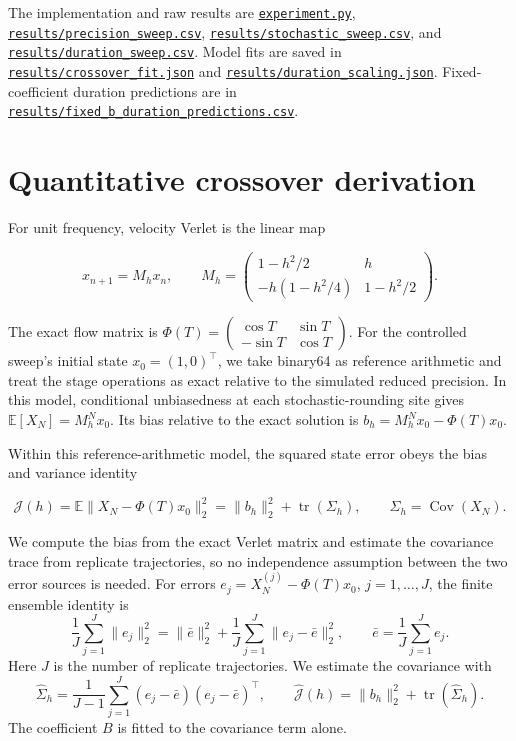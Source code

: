 \documentclass[
11pt
]{article}
\begin{document}
The implementation and raw results are \href{experiment.py}{\nolinkurl{experiment.py}},
\href{results/precision_sweep.csv}{\nolinkurl{results/precision_sweep.csv}},
\href{results/stochastic_sweep.csv}{\nolinkurl{results/stochastic_sweep.csv}}, and
\href{results/duration_sweep.csv}{\nolinkurl{results/duration_sweep.csv}}. Model
fits are saved in \href{results/crossover_fit.json}{\nolinkurl{results/crossover_fit.json}}
and \href{results/duration_scaling.json}{\nolinkurl{results/duration_scaling.json}}.
Fixed-coefficient duration predictions are in
\href{results/fixed_b_duration_predictions.csv}{\nolinkurl{results/fixed_b_duration_predictions.csv}}.

\section{Quantitative crossover derivation}\label{quantitative-crossover-derivation}

For unit frequency, velocity Verlet is the linear map

\[
x_{n+1}=M_hx_n,\qquad M_h=\begin{pmatrix}1-h^2/2&h\\-h(1-h^2/4)&1-h^2/2\end{pmatrix}.
\]

The exact flow matrix is
\(\Phi(T)=\begin{pmatrix}\cos T&\sin T\\-\sin T&\cos T\end{pmatrix}\).
For the controlled sweep's initial state \(x_0=(1,0)^\top\), we take
binary64 as reference arithmetic and treat the stage operations as exact
relative to the simulated reduced precision. In this model, conditional
unbiasedness at each stochastic-rounding site gives
\(\mathbb E[X_N]=M_h^Nx_0\). Its bias relative to the exact solution is
\(b_h=M_h^Nx_0-\Phi(T)x_0\).

Within this reference-arithmetic model, the squared state error obeys
the bias and variance identity

\[
\mathcal J(h)=\mathbb E\|X_N-\Phi(T)x_0\|_2^2
=\|b_h\|_2^2+\operatorname{tr}(\Sigma_h),\qquad
\Sigma_h=\operatorname{Cov}(X_N).
\]

We compute the bias from the exact Verlet matrix and estimate the
covariance trace from replicate trajectories, so no independence
assumption between the two error sources is needed.
For errors \(e_j=X_N^{(j)}-\Phi(T)x_0\), \(j=1,\ldots,J\), the finite
ensemble identity is
\[
\frac1J\sum_{j=1}^J\|e_j\|_2^2
=\|\bar e\|_2^2+\frac1J\sum_{j=1}^J\|e_j-\bar e\|_2^2,
\qquad \bar e=\frac1J\sum_{j=1}^Je_j.
\]
Here \(J\) is the number of replicate trajectories. We estimate the
covariance with
\[
\widehat{\Sigma}_h=\frac{1}{J-1}\sum_{j=1}^J(e_j-\bar e)(e_j-\bar e)^\top,
\qquad
\widehat{\mathcal J}(h)=\|b_h\|_2^2+\operatorname{tr}(\widehat{\Sigma}_h).
\]
The coefficient \(B\) is fitted to the covariance term alone.
\end{document}
